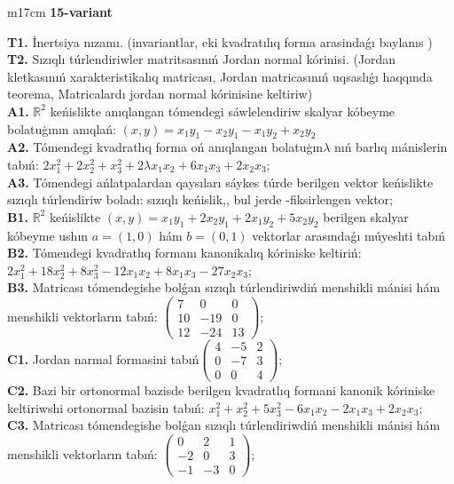 \documentclass{article}
\begin{document}
\begin{tabular}{m{17cm}}
\textbf{15-variant}
\newline

\textbf{T1.} İnertsiya nızamı. (invariantlar,  eki kvadratılıq forma arasindaǵı baylanıs ) \\
\textbf{T2.} Sızıqlı túrlendiriwler matritsasınıń Jordan normal kórinisi. (Jordan kletkasınıń xarakteristikalıq matricası, Jordan matricasınıń uqsaslıǵı haqqında teorema,  Matricalardı jordan normal kórinisine keltiriw) \\
\textbf{A1.} \(\mathbb{R}^{2}\) keńislikte anıqlangan tómendegi sáwlelendiriw skalyar kóbeyme bolatuģının anıqlań: \((x,y) = x_{1}y_{1} - x_{2}y_{1} - x_{1}y_{2} + x_{2}y_{2}\) \\
\textbf{A2.} Tómendegi kvadratlıq forma oń anıqlangan bolatuģın\(\lambda\) nıń barlıq mánislerin tabıń: \(2x_{1}^{2} + 2x_{2}^{2} + x_{3}^{2} + 2\lambda x_{1}x_{2} + 6x_{1}x_{3} + 2x_{2}x_{3}\); \\
\textbf{A3.} Tómendegi ańlatpalardan qaysıları sáykes túrde berilgen vektor keńislikte sızıqlı túrlendiriw boladı: sızıqlı keńislik,, bul jerde -fiksirlengen vektor; \\
\textbf{B1.} \(\mathbb{R}^{2}\) keńislikte \((x,y) = x_{1}y_{1} + 2x_{2}y_{1} + 2x_{1}y_{2} + 5x_{2}y_{2}\) berilgen skalyar kóbeyme ushın \(a = (1,0)\) hám \(b = (0,1)\) vektorlar arasındaǵı múyeshti tabıń \\
\textbf{B2.} Tómendegi kvadratlıq formanı kanonikalıq kóriniske keltiriń: \(2x_{1}^{2} + 18x_{2}^{2} + 8x_{3}^{2} - 12x_{1}x_{2} + 8x_{1}x_{3} - 27x_{2}x_{3}\); \\
\textbf{B3.} Matricası tómendegishe bolǵan sızıqlı túrlendiriwdiń menshikli mánisi hám menshikli vektorların tabıń: \(\begin{pmatrix} 7 & 0 & 0 \\ 10 & - 19 & 0 \\ 12 & - 24 & 13 \end{pmatrix}\); \\
\textbf{C1.} Jordan narmal formasini tabıń\(\begin{pmatrix} 4 & - 5 & 2 \\ 0 & - 7 & 3 \\ 0 & 0 & 4 \end{pmatrix}\); \\
\textbf{C2.} Bazi bir ortonormal bazisde berilgen kvadratlıq formani kanonik kóriniske keltiriwshi ortonormal bazisin tabıń: \(x_{1}^{2} + x_{2}^{2} + 5x_{3}^{2} - 6x_{1}x_{2} - 2x_{1}x_{3} + 2x_{2}x_{3}\); \\
\textbf{C3.} Matricası tómendegishe bolǵan sızıqlı túrlendiriwdiń menshikli mánisi hám menshikli vektorların tabıń: \(\begin{pmatrix} 0 & 2 & 1 \\  - 2 & 0 & 3 \\  - 1 & - 3 & 0 \end{pmatrix}\); \\

\end{tabular}
\vspace{1cm}
\end{document}
